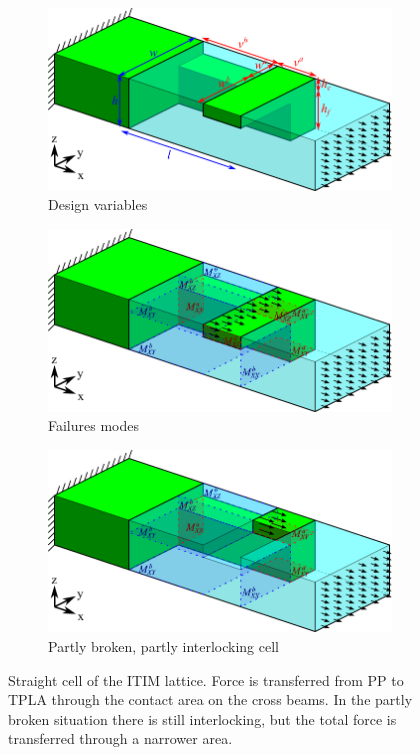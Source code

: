 \begin{figure}
	\centering
	\begin{subfigure}[B]{.33\textwidth}
		\centering
		\includegraphics{sources/method/straight_model_v5_no_failures.pdf}
		\caption{Design variables}
		\label{fig:straight_model}
	\end{subfigure}
	\begin{subfigure}[B]{.33\textwidth}
		\centering
		\includegraphics{sources/method/straight_model_v5_failures.pdf}
		\caption{Failures modes}
		\label{fig:straight_model_failure_modes}
	\end{subfigure}
	\begin{subfigure}[B]{.33\textwidth}
		\centering
		\includegraphics{sources/method/straight_model_v5_broken.pdf}
		\caption{Partly broken, partly interlocking cell}
		\label{fig:straight_model_broken}
	\end{subfigure}
	\caption{Straight cell of the ITIM lattice. Force is transferred from PP to TPLA through the contact area on the cross beams. In the partly broken situation there is still interlocking, but the total force is transferred through a narrower area.}
\end{figure}

